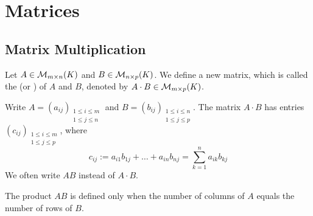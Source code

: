 \renewcommand{\thetheorem}{17.a.\arabic{theorem}}
\setcounter{theorem}{0}
\setcounter{chapter}{16}

\chapter{Matrices}

\section{Matrix Multiplication}
\label{sec:matrix_multiplication}

\begin{definition}
\label{def:matrix_multiplication}
Let $A \in \mathcal{M}_{m \times n}(K)$ and $B \in \mathcal{M}_{n \times p}(K)$. We define a new matrix, which is called the  (or ) of $A$ and $B$, denoted by $A \cdot B \in \mathcal{M}_{m \times p}(K)$.

Write $A = (a_{ij})_{\substack{1 \le i \le m \\ 1 \le j \le n}}$ and $B = (b_{ij})_{\substack{1 \le i \le n \\ 1 \le j \le p}}$. The matrix $A \cdot B$ has entries $(c_{ij})_{\substack{1 \le i \le m \\ 1 \le j \le p}}$, where
\begin{equation*}
    c_{ij} := a_{i1}b_{1j} + \dots + a_{in}b_{nj} = \sum_{k=1}^{n} a_{ik}b_{kj}
\end{equation*}
We often write $AB$ instead of $A \cdot B$. 
\end{definition}

\begin{importantremark}
The product $AB$ is defined only when the number of columns of $A$ equals the number of rows of $B$.
\end{importantremark}

